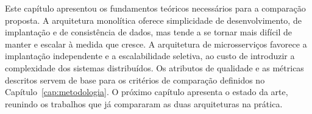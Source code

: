 Este capítulo apresentou os fundamentos teóricos necessários para a comparação proposta. A
arquitetura monolítica oferece simplicidade de desenvolvimento, de implantação e de
consistência de dados, mas tende a se tornar mais difícil de manter e escalar à medida que
cresce. A arquitetura de microsserviços favorece a implantação independente e a escalabilidade
seletiva, ao custo de introduzir a complexidade dos sistemas distribuídos. Os atributos de
qualidade e as métricas descritos servem de base para os critérios de comparação definidos no
Capítulo~\ref{cap:metodologia}. O próximo capítulo apresenta o estado da arte, reunindo os
trabalhos que já compararam as duas arquiteturas na prática.
